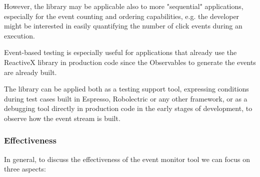 \documentclass[11pt,a4paper,notitlepage]{article}
\begin{document}
However, the library may be applicable also to more "sequential" applications, especially for the event counting and ordering capabilities, e.g. the developer might be interested in easily quantifying the number of click events during an execution.

Event-based testing is especially useful for applications that already use the ReactiveX library in production code since the Observables to generate the events are already built.

The library can be applied both as a testing support tool, expressing conditions during test cases built in Espresso, Robolectric or any other framework, or as a debugging tool directly in production code in the early stages of development, to observe how the event stream is built.

\subsubsection{Effectiveness}
In general, to discuss the effectiveness of the event monitor tool we can focus on three aspects:
\end{document}
